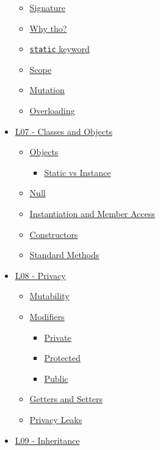 \documentclass[]{article}
\providecommand{\tightlist}{%
  \setlength{\itemsep}{0pt}\setlength{\parskip}{0pt}}
\begin{document}
\begin{itemize}
  \begin{itemize}
  \tightlist
  \item
    \protect\hyperlink{signature}{Signature}
  \item
    \protect\hyperlink{why-thoux3f}{Why tho?}
  \item
    \protect\hyperlink{ux5cux2560staticux5cux2560-keyword}{\texttt{static}
    keyword}
  \item
    \protect\hyperlink{scope}{Scope}
  \item
    \protect\hyperlink{mutation}{Mutation}
  \item
    \protect\hyperlink{overloading}{Overloading}
  \end{itemize}
\item
  \protect\hyperlink{l07---classes-and-objects}{L07 - Classes and
  Objects}

  \begin{itemize}
  \tightlist
  \item
    \protect\hyperlink{objects}{Objects}

    \begin{itemize}
    \tightlist
    \item
      \protect\hyperlink{static-vs-instance}{Static vs Instance}
    \end{itemize}
  \item
    \protect\hyperlink{null}{Null}
  \item
    \protect\hyperlink{instantiation-and-member-access}{Instantiation
    and Member Access}
  \item
    \protect\hyperlink{constructors}{Constructors}
  \item
    \protect\hyperlink{standard-methods}{Standard Methods}
  \end{itemize}
\item
  \protect\hyperlink{l08---privacy}{L08 - Privacy}

  \begin{itemize}
  \tightlist
  \item
    \protect\hyperlink{mutability}{Mutability}
  \item
    \protect\hyperlink{modifiers}{Modifiers}

    \begin{itemize}
    \tightlist
    \item
      \protect\hyperlink{private}{Private}
    \item
      \protect\hyperlink{protected}{Protected}
    \item
      \protect\hyperlink{public}{Public}
    \end{itemize}
  \item
    \protect\hyperlink{getters-and-setters}{Getters and Setters}
  \item
    \protect\hyperlink{privacy-leaks}{Privacy Leaks}
  \end{itemize}
\item
  \protect\hyperlink{l09---inheritance}{L09 - Inheritance}


\end{itemize}
\end{document}
